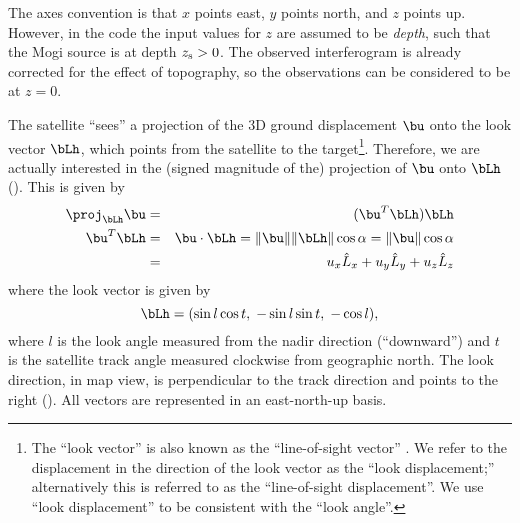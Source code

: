 \documentclass[11pt,titlepage,fleqn]{article}
\begin{document}
The axes convention is that $x$ points east, $y$ points north, and $z$ points up. However, in the code the input values for $z$ are assumed to be {\em depth}, such that the Mogi source is at depth $z_{\rm s} > 0$. The observed interferogram is already corrected for the effect of topography, so the observations can be considered to be at $z=0$. 

%



The satellite ``sees'' a projection of the 3D ground displacement $\bu$ onto the look vector $\bLh$, which points from the satellite to the target\footnote{The ``look vector'' is also known as the ``line-of-sight vector'' \citep[][Figure~10]{SimonsRosen2007}. We refer to the displacement in the direction of the look vector as the ``look displacement;'' alternatively this is referred to as the ``line-of-sight displacement''. We use ``look displacement'' to be consistent with the ``look angle''.}.
Therefore, we are actually interested in the (signed magnitude of the) projection of $\bu$ onto $\bLh$ (). This is given by
%
\begin{eqnarray}
\proj_{\bLh} \bu &=& (\bu^T\bLh)\bLh
\\
\bu^T\bLh &=& \bu \cdot \bLh = \|\bu\| \|\bLh\| \cos\alpha = \|\bu\| \cos\alpha 
\\
&=& u_x \hat{L}_x + u_y \hat{L}_y + u_z \hat{L}_z
\label{UL}
\end{eqnarray}
%
where the look vector is given by
%
\begin{equation}
\bLh = (\sin l \cos t,\; -\sin l \sin t,\; -\cos l),
\label{L}
\end{equation}
%
where $l$ is the look angle measured from the nadir direction (``downward'') and $t$ is the satellite track angle measured clockwise from geographic north. The look direction, in map view, is perpendicular to the track direction and points to the right (). All vectors are represented in an east-north-up basis.
\end{document}
